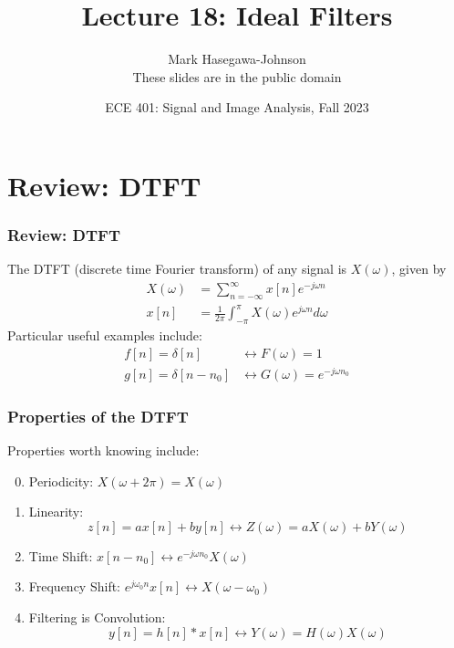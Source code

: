 \documentclass{beamer}
\title{Lecture 18: Ideal Filters}
\author{Mark Hasegawa-Johnson\\These slides are in the public domain}
\date{ECE 401: Signal and Image Analysis, Fall 2023}
\begin{document}
\begin{frame}
  \maketitle
\end{frame}

\begin{frame}
  \tableofcontents
\end{frame}

\section[DTFT]{Review: DTFT}
\setcounter{subsection}{1}

\begin{frame}
  \frametitle{Review: DTFT}

  The DTFT (discrete time Fourier transform) of any signal is
  $X(\omega)$, given by
  \begin{align*}
    X(\omega) &= \sum_{n=-\infty}^\infty x[n]e^{-j\omega n}\\
    x[n] &= \frac{1}{2\pi}\int_{-\pi}^\pi X(\omega)e^{j\omega n}d\omega
  \end{align*}
  Particular useful examples include:
  \begin{align*}
    f[n]=\delta[n] &\leftrightarrow F(\omega)=1\\
    g[n]=\delta[n-n_0] &\leftrightarrow G(\omega)=e^{-j\omega n_0}
  \end{align*}
\end{frame}

\begin{frame}
  \frametitle{Properties of the DTFT}

  Properties worth knowing  include:
  \begin{enumerate}
    \setcounter{enumi}{-1}
  \item Periodicity: $X(\omega+2\pi)=X(\omega)$
  \item Linearity:
    \[z[n]=ax[n]+by[n]\leftrightarrow Z(\omega)=aX(\omega)+bY(\omega)
    \]
  \item Time Shift: $x[n-n_0]\leftrightarrow e^{-j\omega n_0}X(\omega)$
  \item Frequency Shift: $e^{j\omega_0 n}x[n]\leftrightarrow X(\omega-\omega_0)$
  \item Filtering is Convolution:
    \[
    y[n]=h[n]\ast x[n]\leftrightarrow Y(\omega)=H(\omega)X(\omega)
    \]
  \end{enumerate}
\end{frame}
\end{document}
